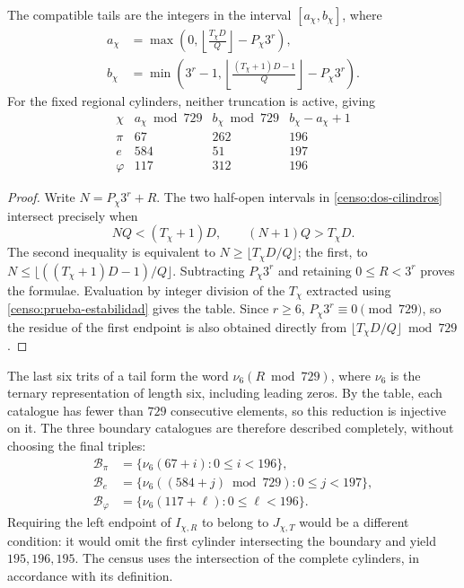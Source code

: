 \begin{proposition}
\label{censo:catalogos}
The compatible tails are the integers in the interval \([a_\chi,b_\chi]\),
where
\begin{align}
 a_\chi&=\max\left(0,
       \left\lfloor\frac{T_\chi D}{Q}\right\rfloor-P_\chi3^r\right),
       \label{censo:extremo-a}\\
 b_\chi&=\min\left(3^r-1,
       \left\lfloor\frac{(T_\chi+1)D-1}{Q}\right\rfloor-P_\chi3^r\right).
       \label{censo:extremo-b}
\end{align}
For the fixed regional cylinders, neither truncation is active, giving
\begin{equation}
\begin{array}{c|r|r|r}
 \chi&a_\chi\bmod729&b_\chi\bmod729&b_\chi-a_\chi+1\\\hline
 \pi&67&262&196\\
 e&584&51&197\\
 \varphi&117&312&196
\end{array}
\label{censo:tabla-catalogos}
\end{equation}
\end{proposition}
\begin{proof}
Write \(N=P_\chi3^r+R\). The two half-open intervals in
\eqref{censo:dos-cilindros} intersect precisely when
\[
 NQ<(T_\chi+1)D,\qquad (N+1)Q>T_\chi D.
\]
The second inequality is equivalent to
\(N\geq\lfloor T_\chi D/Q\rfloor\); the first, to
\(N\leq\lfloor((T_\chi+1)D-1)/Q\rfloor\). Subtracting
\(P_\chi3^r\) and retaining \(0\leq R<3^r\) proves the formulae.
Evaluation by integer division of the \(T_\chi\) extracted using
\eqref{censo:prueba-estabilidad} gives the table. Since \(r\geq6\),
\(P_\chi3^r\equiv0\pmod{729}\), so the residue of the first
endpoint is also obtained directly from
\(\lfloor T_\chi D/Q\rfloor\bmod729\).
\end{proof}

The last six trits of a tail form the word
\(\nu_6(R\bmod729)\), where \(\nu_6\) is the ternary representation
of length six, including leading zeros. By the table, each
catalogue has fewer than \(729\) consecutive elements, so
this reduction is injective on it. The three boundary catalogues
are therefore described completely, without choosing the final triples:
\begin{equation}
 \begin{split}
 \mathcal B_\pi&=\{\nu_6(67+i):0\leq i<196\},\\
 \mathcal B_e&=\{\nu_6((584+j)\bmod729):0\leq j<197\},\\
 \mathcal B_\varphi&=\{\nu_6(117+\ell):0\leq\ell<196\}.
 \end{split}
 \label{censo:fronteras-explicitas}
\end{equation}
Requiring the left endpoint of \(I_{\chi,R}\) to belong to
\(J_{\chi,T}\) would be a different condition: it would omit the first
cylinder intersecting the boundary and yield \(195,196,195\). The census
uses the intersection of the complete cylinders, in accordance with its definition.

